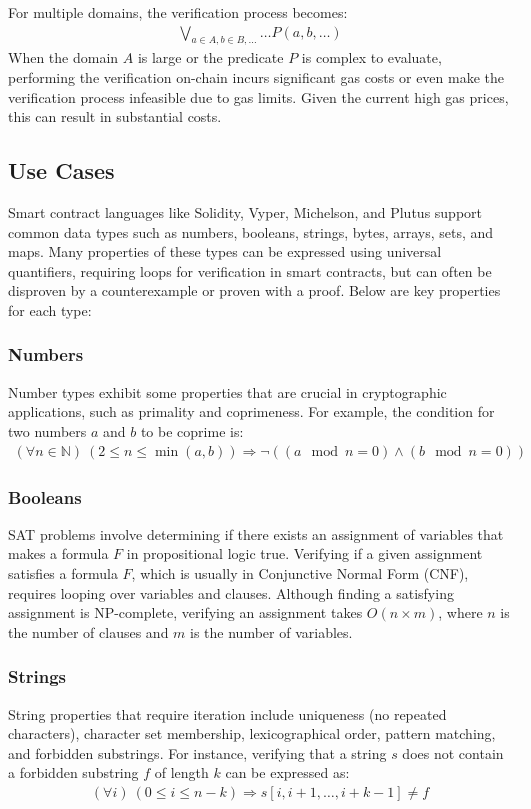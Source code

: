 \documentclass[runningheads]{llncs}
\begin{document}
For multiple domains, the verification process becomes:
\begin{gather}
  \label{eq:8}
  \bigvee_{a \in A, b \in B, \dots} \dots P(a, b, \dots)
\end{gather}
When the domain \(A\) is large or the predicate \(P\) is complex to evaluate, performing the verification on-chain incurs significant gas costs or even make the verification process infeasible due to gas limits. Given the current high gas prices, this can result in substantial costs.
\subsection{Use Cases}
Smart contract languages like Solidity, Vyper, Michelson, and Plutus support common data types such as numbers, booleans, strings, bytes, arrays, sets, and maps. Many properties of these types can be expressed using universal quantifiers, requiring loops for verification in smart contracts, but can often be disproven by a counterexample or proven with a proof. Below are key properties for each type:
\subsubsection{Numbers}
Number types exhibit some properties that are crucial in cryptographic applications, such as primality and coprimeness. For example, the condition for two numbers \(a\) and \(b\) to be coprime is:
\begin{gather*}
\label{}
(\forall n \in \mathbb{N}) \ (2 \leq n \leq \min(a, b)) \Rightarrow \neg((a \mod n = 0) \wedge (b \mod n = 0))
\end{gather*}
\subsubsection{Booleans}
SAT problems involve determining if there exists an assignment of variables that makes a formula \( F \) in propositional logic true. Verifying if a given assignment satisfies a formula \( F \), which is usually in Conjunctive Normal Form (CNF), requires looping over variables and clauses. Although finding a satisfying assignment is NP-complete, verifying an assignment takes \( O(n \times m) \), where \( n \) is the number of clauses and \( m \) is the number of variables.
\subsubsection{Strings}
String properties that require iteration include uniqueness (no repeated characters), character set membership, lexicographical order, pattern matching, and forbidden substrings. For instance, verifying that a string \(s\) does not contain a forbidden substring \(f\) of length \(k\) can be expressed as:
\begin{gather*}
(\forall i) \ (0 \leq i \leq n - k) \Rightarrow s[i, i+1, \dots, i+k-1] \neq f
\end{gather*}
\end{document}
